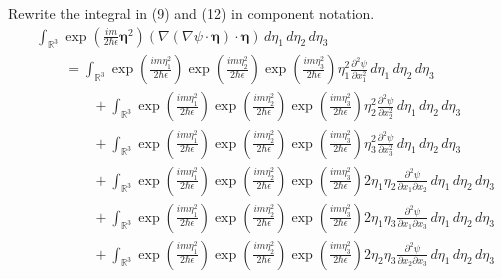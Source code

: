 \documentclass[12pt]{article}
\begin{document}
Rewrite the integral in (9) and (12) in component notation.
\begin{align*}
&\int_{\mathbb R^3}
\exp\left(\frac{im}{2\hbar\epsilon}\boldsymbol\eta^2\right)
(\nabla(\nabla\psi\cdot\boldsymbol\eta)\cdot\boldsymbol\eta)
\,d\eta_1\,d\eta_2\,d\eta_3
\\
&\qquad{}=\int_{\mathbb R^3}
\exp\left(\frac{im\eta_1^2}{2\hbar\epsilon}\right)
\exp\left(\frac{im\eta_2^2}{2\hbar\epsilon}\right)
\exp\left(\frac{im\eta_3^2}{2\hbar\epsilon}\right)
\eta_1^2\frac{\partial^2\psi}{\partial x_1^2}
\,d\eta_1\,d\eta_2\,d\eta_3
\\
&\qquad\qquad{}+\int_{\mathbb R^3}
\exp\left(\frac{im\eta_1^2}{2\hbar\epsilon}\right)
\exp\left(\frac{im\eta_2^2}{2\hbar\epsilon}\right)
\exp\left(\frac{im\eta_3^2}{2\hbar\epsilon}\right)
\eta_2^2\frac{\partial^2\psi}{\partial x_2^2}
\,d\eta_1\,d\eta_2\,d\eta_3
\\
&\qquad\qquad{}+\int_{\mathbb R^3}
\exp\left(\frac{im\eta_1^2}{2\hbar\epsilon}\right)
\exp\left(\frac{im\eta_2^2}{2\hbar\epsilon}\right)
\exp\left(\frac{im\eta_3^2}{2\hbar\epsilon}\right)
\eta_3^2\frac{\partial^2\psi}{\partial x_3^2}
\,d\eta_1\,d\eta_2\,d\eta_3
\\
&\qquad\qquad{}+\int_{\mathbb R^3}
\exp\left(\frac{im\eta_1^2}{2\hbar\epsilon}\right)
\exp\left(\frac{im\eta_2^2}{2\hbar\epsilon}\right)
\exp\left(\frac{im\eta_3^2}{2\hbar\epsilon}\right)
2\eta_1\eta_2\frac{\partial^2\psi}{\partial x_1\partial x_2}
\,d\eta_1\,d\eta_2\,d\eta_3
\\
&\qquad\qquad{}+\int_{\mathbb R^3}
\exp\left(\frac{im\eta_1^2}{2\hbar\epsilon}\right)
\exp\left(\frac{im\eta_2^2}{2\hbar\epsilon}\right)
\exp\left(\frac{im\eta_3^2}{2\hbar\epsilon}\right)
2\eta_1\eta_3\frac{\partial^2\psi}{\partial x_1\partial x_3}
\,d\eta_1\,d\eta_2\,d\eta_3
\\
&\qquad\qquad{}+\int_{\mathbb R^3}
\exp\left(\frac{im\eta_1^2}{2\hbar\epsilon}\right)
\exp\left(\frac{im\eta_2^2}{2\hbar\epsilon}\right)
\exp\left(\frac{im\eta_3^2}{2\hbar\epsilon}\right)
2\eta_2\eta_3\frac{\partial^2\psi}{\partial x_2\partial x_3}
\,d\eta_1\,d\eta_2\,d\eta_3
\end{align*}
\end{document}
